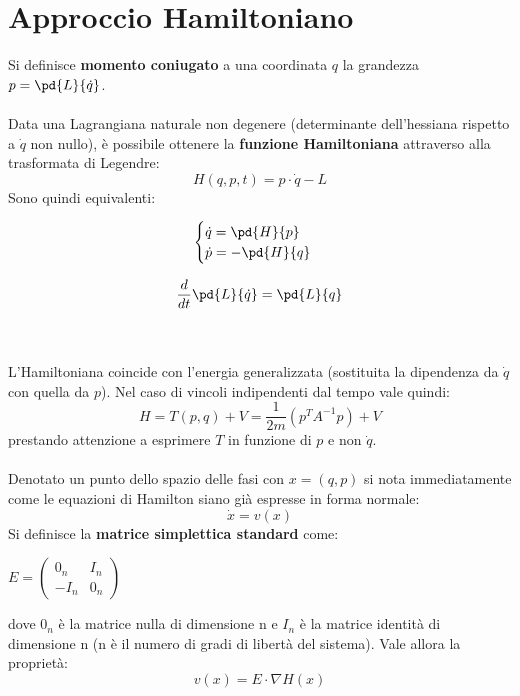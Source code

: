 \documentclass{article}
\begin{document}
\newpage
\section{Approccio Hamiltoniano}
Si definisce \textbf{momento coniugato} a una coordinata $q$ la grandezza $p=\pd{L}{\dot q}$.\\\\
Data una Lagrangiana naturale non degenere (determinante dell'hessiana rispetto a $\dot q$ non nullo), è possibile ottenere la \textbf{funzione Hamiltoniana} attraverso alla trasformata di Legendre:
$$ H(q,p,t) = p\cdot\dot q - L $$
Sono quindi equivalenti:

\begin{minipage}[c]{.45\columnwidth}
\begin{center}
\begin{equation*}
    \begin{cases}
        \dot q=\pd{H}{p}\\
        \dot p=-\pd{H}{q}
    \end{cases}
\end{equation*}
\end{center}
\end{minipage}
\begin{minipage}[c]{.45\columnwidth}
\begin{center}
$$ \frac{d}{dt}\pd{L}{\dot q}=\pd{L}{q} $$
\end{center}
\end{minipage}
\\\\
L'Hamiltoniana coincide con l'energia generalizzata (sostituita la dipendenza da $\dot q$ con quella da $p$). Nel caso di vincoli indipendenti dal tempo vale quindi:
$$ H=T(p,q)+V=\frac{1}{2m}(p^TA^{-1}p)+V $$
prestando attenzione a esprimere $T$ in funzione di $p$ e non $\dot q$.\\\\
Denotato un punto dello spazio delle fasi con $x=(q, p)$ si nota immediatamente come le equazioni di Hamilton siano già espresse in forma normale:
$$ \dot x=v(x) $$
Si definisce la \textbf{matrice simplettica standard} come:\\
\begin{center}
$E=
\begin{pmatrix}
    0_n & I_n\\
    -I_n & 0_n
\end{pmatrix}
$
\end{center}
dove $0_n$ è la matrice nulla di dimensione n e $I_n$ è la matrice identità di dimensione n (n è il numero di gradi di libertà del sistema). Vale allora la proprietà:
$$ v(x)=E\cdot\nabla H(x) $$
\end{document}
